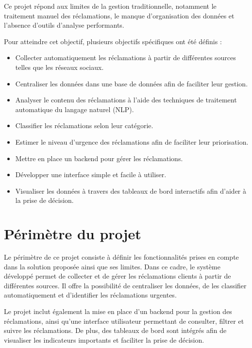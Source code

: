\documentclass[12pt,a4paper,oneside]{report}
\begin{document}
Ce projet répond aux limites de la gestion traditionnelle, notamment le traitement manuel des réclamations, le manque d’organisation des données et l’absence d’outils d’analyse performants.

Pour atteindre cet objectif, plusieurs objectifs spécifiques ont été définis :

\begin{itemize}
\item Collecter automatiquement les réclamations à partir de différentes sources telles que les réseaux sociaux.

\item Centraliser les données dans une base de données afin de faciliter leur gestion.

\item Analyser le contenu des réclamations à l’aide des techniques de traitement automatique du langage naturel (NLP).

\item Classifier les réclamations selon leur catégorie.

\item Estimer le niveau d’urgence des réclamations afin de faciliter leur priorisation.

\item Mettre en place un backend pour gérer les réclamations.

\item Développer une interface simple et facile à utiliser.

\item Visualiser les données à travers des tableaux de bord interactifs afin d’aider à la prise de décision.
\end{itemize}

\section{Périmètre du projet}

Le périmètre de ce projet consiste à définir les fonctionnalités prises en compte dans la solution proposée ainsi que ses limites. Dans ce cadre, le système développé permet de collecter et de gérer les réclamations clients à partir de différentes sources. Il offre la possibilité de centraliser les données, de les classifier automatiquement et d’identifier les réclamations urgentes.

Le projet inclut également la mise en place d’un backend pour la gestion des réclamations, ainsi qu’une interface utilisateur permettant de consulter, filtrer et suivre les réclamations. De plus, des tableaux de bord sont intégrés afin de visualiser les indicateurs importants et faciliter la prise de décision.
\end{document}
